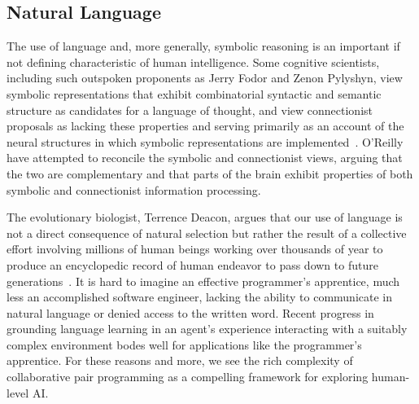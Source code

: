 
\subsection{Natural Language}


The use of language and, more generally, symbolic reasoning is an important if not defining characteristic of human intelligence. Some cognitive scientists, including such outspoken proponents as Jerry Fodor and Zenon Pylyshyn, view symbolic representations that exhibit combinatorial syntactic and semantic structure as candidates for a language of thought, and view connectionist proposals as lacking these properties and serving primarily as an account of the neural structures in which symbolic representations are implemented~\cite{FodorandPylyshynCOGNITION-88,Fodor84}. O'Reilly~\etal{}~\cite{OReillyetalTACO-14} have attempted to reconcile the symbolic and connectionist views, arguing that the two are complementary and that parts of the brain exhibit properties of both symbolic and connectionist information processing. 

The evolutionary biologist, Terrence Deacon, argues that our use of language is not a direct consequence of natural selection but rather the result of a collective effort involving millions of human beings working over thousands of year to produce an encyclopedic record of human endeavor to pass down to future generations~\cite{Deacon1998symbolic}. It is hard to imagine an effective programmer's apprentice, much less an accomplished software engineer, lacking the ability to communicate in natural language or denied access to the written word. Recent progress in grounding language learning in an agent's experience interacting with a suitably complex environment bodes well for applications like the programmer's apprentice. For these reasons and more, we see the rich complexity of collaborative pair programming as a compelling framework for exploring human-level AI.


  
